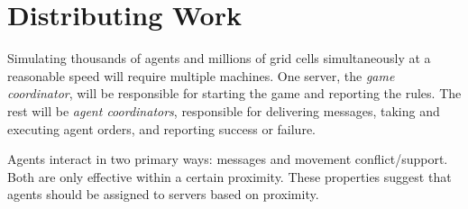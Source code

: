 \section{Distributing Work}

Simulating thousands of agents and millions of grid cells simultaneously at a reasonable speed will require multiple machines. One server, the \emph{game coordinator}, will be responsible for starting the game and reporting the rules. The rest will be \emph{agent coordinators}, responsible for delivering messages, taking and executing agent orders, and reporting success or failure.

Agents interact in two primary ways: messages and movement conflict/support. Both are only effective within a certain proximity. These properties suggest that agents should be assigned to servers based on proximity.